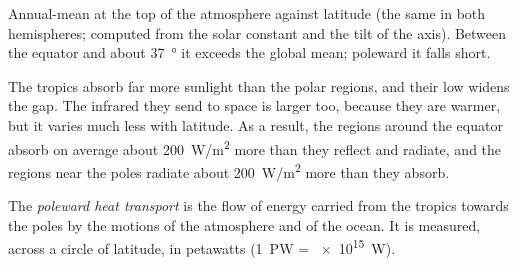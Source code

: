\begin{omfigure}

{\small Annual-mean  at the top of the atmosphere against latitude
(the same in both hemispheres; computed from the solar constant and the tilt
of the axis). Between the equator and about \qty{37}{\degree} it exceeds the
global mean; poleward it falls short.}
\end{omfigure}

The tropics absorb far more sunlight than the polar regions, and their low
 widens the gap. The infrared they send to space is larger too,
because they are warmer, but it varies much less with latitude. As a result,
the regions around the equator absorb on average about \qty{200}{W/m^2} more
than they reflect and radiate, and the regions near the poles radiate about
\qty{200}{W/m^2} more than they absorb.

\begin{definition}\label{def:g10:earth-energy-budget:heat-transport}
The \emph{poleward heat transport} is the
flow of energy carried from the tropics towards the poles by the motions of
the atmosphere and of the ocean. It is measured, across a circle of
latitude, in petawatts (\qty{1}{PW} = \qty{e15}{W}).
\end{definition}

